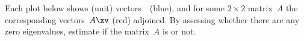 \begin{exercise} \label{ex:} 
Each plot below shows (unit) vectors~\xv\ (blue), and for some \(2\times 2\) matrix~\(A\) the corresponding vectors~\(A\xv\) (red) adjoined. 
By assessing whether there are any zero eigenvalues, estimate if the matrix~\(A\) is  or not.

\begin{parts}
\item{}%

\item{}

\item{}

\item{}%

\item{}

\item{}

\end{parts}
\end{exercise}



